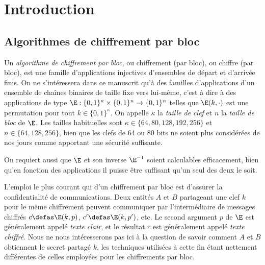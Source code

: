 



\chapter[Introduction]{Introduction}

%
%
%


\section{Algorithmes de chiffrement par bloc}

Un \emph{algorithme de chiffrement par bloc}, ou chiffrement (par bloc), ou chiffre (par bloc), est une famille d'applications
injectives d'ensembles de départ et d'arrivée finis.
On ne s'intéressera dans ce manuscrit qu'à des familles d'applications d'un ensemble de chaînes binaires de taille
fixe vers lui-même, c'est à dire à des applications de type
$\E : \{0,1\}^\kappa \times \{0,1\}^n \rightarrow \{0,1\}^n$
telles que $\E(k,\cdot)$ est une permutation pour tout $k \in \{0,1\}^\kappa$. 
On appelle
$\kappa$ la \emph{taille de clef} et $n$ la \emph{taille de bloc} de $\E$. Les tailles habituelles sont
$\kappa \in \{64, 80, 128, 192, 256\}$ et
$n \in \{64, 128, 256\}$, bien que les clefs de 64 ou 80 bits ne soient plus considérées de nos jours
comme apportant une sécurité suffisante.

On requiert aussi que $\E$ et son inverse $\E^{-1}$ soient calculables efficacement, bien qu'en fonction des applications
il puisse être suffisant qu'un seul des deux le soit.

L'emploi le plus courant qui d'un chiffrement par bloc est d'assurer la confidentialité de communications.
Deux entités $A$ et $B$ partageant une clef $k$ pour le même chiffrement
peuvent communiquer par l'intermédiaire de messages chiffrés $c \defas \E(k,p)$,
$c' \defas \E(k,p')$, etc. Le second argument $p$ de $\E$ est généralement appelé
\emph{texte clair}, et le résultat $c$ est généralement appelé \emph{texte chiffré}.
Nous ne nous intéresserons pas ici à la question de savoir
comment $A$ et $B$ obtiennent le secret partagé $k$, les techniques utilisées à cette fin étant nettement différentes
de celles employées pour les chiffrements par bloc.


